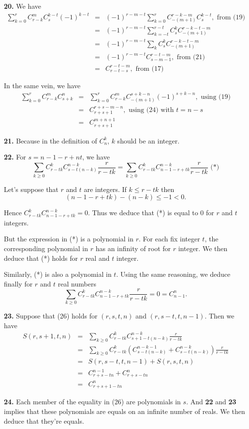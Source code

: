 \documentclass[a4paper,12pt]{article}
\newcommand{\newpar}[1]{\bigskip \noindent \textbf{#1.}}
\begin{document}
\newpar{20} We have
\begin{eqnarray*}
  \sum_{k=0}^r C_{r-k}^m C_s^{k-t} (-1)^{k-t} &=&
  (-1)^{r-m-t} \sum_{k=0}^r C_{-(m+1)}^{r-k-m} C_s^{k-t},\mbox{ from
    (19)} \\
  &=& (-1)^{r-m-t} \sum_{k=-t}^{r-t} C_s^k C_{-(m+1)}^{r-k-t-m} \\
  &=& (-1)^{r-m-t} \sum_k C_s^k C_{-(m+1)}^{r-k-t-m} \\
  &=& (-1)^{r-m-t} C_{s-m-1}^{r-t-m}, \mbox{ from (21)} \\
  &=& C_{r-t-s}^{r-t-m},\mbox{ from (17)}
\end{eqnarray*}

In the same vein, we have
\begin{eqnarray*}
  \sum_{k=0}^r C_{r-k}^m C_{s+k}^n &=& \sum_{k=0}^r C_{r-k}^m
  C_{-(m+1)}^{s+k-n} (-1)^{s+k-n}, \mbox{ using (19)} \\
  &=& C_{r+s+1}^{r+s-m-n}, \mbox{ using (24) with $t = n-s$} \\
  &=& C_{r+s+1}^{m+n+1}
\end{eqnarray*}

\newpar{21} Because in the definition of $C_n^k$, $k$ should be an
integer.

\newpar{22} For $s = n-1-r+nt$, we have
\[\sum_{k\ge 0} C_{r-tk}^k C_{s-t(n-k)}^{n-k} \frac{r}{r-tk} = \sum_{k\ge 0} C_{r-tk}^k
  C_{n-1-r+tk}^{n-k} \frac{r}{r-tk} \mbox{ (*)}\]

Let's suppose that $r$ and $t$ are integers. If $k \le r - tk$ then
\[ (n-1-r+tk) - (n-k) \le -1 < 0.\]

Hence $C_{r-tk}^k C_{n-1-r+tk}^{n-k} = 0$.  Thus we deduce that (*) is
equal to $0$ for $r$ and $t$ integers.

But the expression in (*) is a polynomial in $r$.  For each fix integer
$t$, the corresponding polynomial in $r$ has an infinity of root for
$r$ integer.  We then deduce that (*) holds for $r$ real and $t$
integer.

Similarly, (*) is also a polynomial in $t$.  Using the same reasoning,
we deduce finally for $r$ and $t$ real numbers
\[\sum_{k\ge 0} C_{r-tk}^k C_{n-1-r+tk}^{n-k} \frac{r}{r-tk} = 0 =
C_{n-1}^n.\]

\newpar{23}  Suppose that (26) holds for $(r,s,t,n)$ and
$(r,s-t,t,n-1)$.  Then we have
\begin{eqnarray*}
  S(r,s+1,t,n) &=& \sum_{k\ge 0} C_{r-tk}^k C_{s+1-t(n-k)}^{n-k}
  \frac{r}{r-tk}\\
  &=& \sum_{k\ge 0} C_{r-tk}^k \left( C_{s-t(n-k)}^{n-k-1} +
  C_{s-t(n-k)}^{n-k}\right) \frac{r}{r-tk} \\
  &=& S(r,s-t,t,n-1) + S(r,s,t,n) \\
  &=& C_{r+s-tn}^{n-1} + C_{r+s-tn}^n \\
  &=& C_{r+s+1-tn}^n
\end{eqnarray*}

\newpar{24} Each member of the equality in (26) are polynomials in
$s$.  And \textbf{22} and \textbf{23} implies that these polynomials
are equals on an infinite number of reals.  We then deduce that
they're equals.
\end{document}
